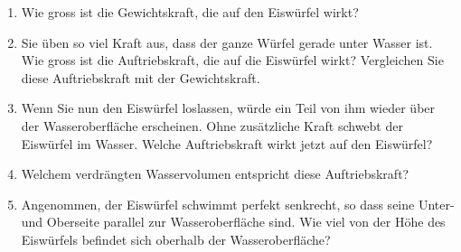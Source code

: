 \documentclass[11pt]{article}
\begin{document}
\begin{enumerate}[label=(\alph*)]
    \vspace{-0.5cm}
    \item Wie gross ist die Gewichtskraft, die auf den Eiswürfel wirkt? \vspace{2cm}
    
    \item Sie üben so viel Kraft aus, dass der ganze Würfel gerade unter Wasser ist. Wie gross ist die Auftriebskraft, die auf die Eiswürfel wirkt? Vergleichen Sie diese Auftriebskraft mit der Gewichtskraft. \vspace{2cm}
    
    \item Wenn Sie nun den Eiswürfel loslassen, würde ein Teil von ihm wieder über der Wasseroberfläche erscheinen. Ohne zusätzliche Kraft schwebt der Eiswürfel im Wasser. Welche Auftriebskraft wirkt jetzt auf den Eiswürfel? \vspace{2cm}

    \item Welchem verdrängten Wasservolumen entspricht diese Auftriebskraft? \vspace{2cm}

    \item Angenommen, der Eiswürfel schwimmt perfekt senkrecht, so dass seine Unter- und Oberseite parallel zur Wasseroberfläche sind. Wie viel von der Höhe des Eiswürfels befindet sich oberhalb der Wasseroberfläche?
\end{enumerate}





    
\end{document}
